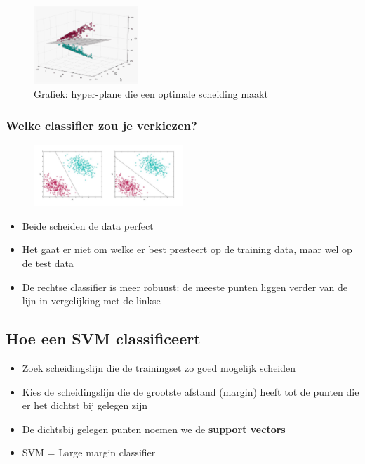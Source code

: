 \documentclass{article}
\begin{document}
\begin{figure}[H]
    \centering
    \includegraphics[width=0.35\textwidth]{svm.png}
    \caption{Grafiek: hyper-plane die een optimale scheiding maakt}
\end{figure}

\subsubsection{Welke classifier zou je verkiezen?}

\begin{figure}[H]
    \centering
    \includegraphics[width=0.5\textwidth]{svm-classifiers.png}
    \caption{}
\end{figure}

\begin{itemize}
    \item Beide scheiden de data perfect
    \item Het gaat er niet om welke er best presteert op de training data, maar wel op de test data
    \item De rechtse classifier is meer robuust: de meeste punten liggen verder van de lijn in vergelijking met de linkse
\end{itemize}

\subsection{Hoe een SVM classificeert}

\begin{itemize}
    \item Zoek scheidingslijn die de trainingset zo goed mogelijk scheiden
    \item Kies de scheidingslijn die de grootste afstand (margin) heeft tot de punten die er het dichtst bij gelegen zijn
    \item De dichtsbij gelegen punten noemen we de \textbf{support vectors}
    \item SVM = Large margin classifier
\end{itemize}
\end{document}
